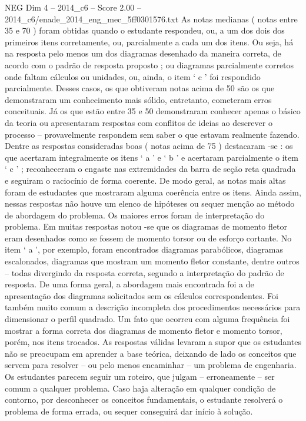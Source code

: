 \begin{textsample}{NEG Dim 4 – 2014\_c6 – Score 2.00 – 2014\_c6/enade\_2014\_eng\_mec\_5ff0301576.txt}
As notas medianas ( notas entre 35 e 70 ) foram obtidas quando o estudante respondeu, ou, a um dos dois dos primeiros itens corretamente, ou, parcialmente a cada um dos itens.
Ou seja, há na resposta pelo menos um dos diagramas desenhado da maneira correta, de acordo com o padrão de resposta proposto ; ou diagramas parcialmente corretos onde faltam cálculos ou unidades, ou, ainda, o item ‘ c ’ foi respondido parcialmente.
Desses casos, os que obtiveram notas acima de 50 são os que demonstraram um conhecimento mais sólido, entretanto, cometeram erros conceituais.
Já os que estão entre 35 e 50 demonstraram conhecer apenas o básico da teoria ou apresentaram respostas com conflitos de ideias ao descrever o processo – provavelmente respondem sem saber o que estavam realmente fazendo.
Dentre as respostas consideradas boas ( notas acima de 75 ) destacaram -se : os que acertaram integralmente os itens ‘ a ’ e ‘ b ’ e acertaram parcialmente o item ‘ c ’ ; reconheceram o engaste nas extremidades da barra de seção reta quadrada e seguiram o raciocínio de forma coerente.
De modo geral, as notas mais altas foram de estudantes que mostraram alguma coerência entre os itens.
Ainda assim, nessas respostas não houve um elenco de hipóteses ou sequer menção ao método de abordagem do problema.
Os maiores erros foram de interpretação do problema.
Em muitas respostas notou -se que os diagramas de momento fletor eram desenhados como se fossem de momento torsor ou de esforço cortante.
No item ‘ a ’, por exemplo, foram encontrados diagramas parabólicos, diagramas escalonados, diagramas que mostram um momento fletor constante, dentre outros – todas divergindo da resposta correta, segundo a interpretação do padrão de resposta.
De uma forma geral, a abordagem mais encontrada foi a de apresentação dos diagramas solicitados sem os cálculos correspondentes.
Foi também muito comum a descrição incompleta dos procedimentos necessários para dimensionar o perfil quadrado.
Um fato que ocorreu com alguma frequência foi mostrar a forma correta dos diagramas de momento fletor e momento torsor, porém, nos itens trocados.
As respostas válidas levaram a supor que os estudantes não se preocupam em aprender a base teórica, deixando de lado os conceitos que servem para resolver – ou pelo menos encaminhar – um problema de engenharia.
Os estudantes parecem seguir um roteiro, que julgam – erroneamente – ser comum a qualquer problema.
Caso haja alteração em qualquer condição de contorno, por desconhecer os conceitos fundamentais, o estudante resolverá o problema de forma errada, ou sequer conseguirá dar início à solução.

\end{textsample}
